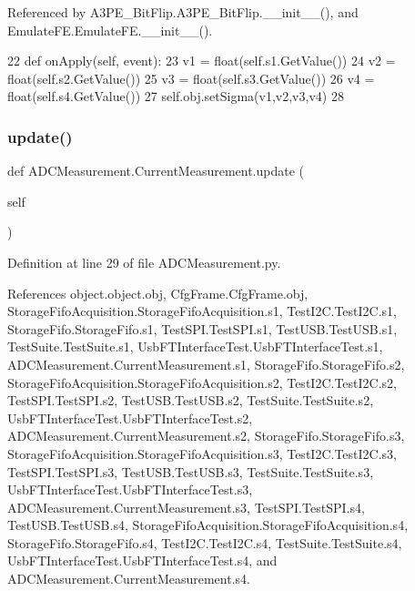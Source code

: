 Referenced by A3\+P\+E\+\_\+\+Bit\+Flip.\+A3\+P\+E\+\_\+\+Bit\+Flip.\+\_\+\+\_\+init\+\_\+\+\_\+(), and Emulate\+F\+E.\+Emulate\+F\+E.\+\_\+\+\_\+init\+\_\+\+\_\+().


\begin{DoxyCode}
22     \textcolor{keyword}{def }onApply(self, event):
23         v1 = float(self.s1.GetValue())
24         v2 = float(self.s2.GetValue())
25         v3 = float(self.s3.GetValue())
26         v4 = float(self.s4.GetValue())
27         self.obj.setSigma(v1,v2,v3,v4)
28 
\end{DoxyCode}
\mbox{\label{classADCMeasurement_1_1CurrentMeasurement_af3fb35c2334ccea6ac6274604bf09703}} 
\subsubsection{\texorpdfstring{update()}{update()}}
{\footnotesize\ttfamily def A\+D\+C\+Measurement.\+Current\+Measurement.\+update (\begin{DoxyParamCaption}\item[{}]{self }\end{DoxyParamCaption})}



Definition at line 29 of file A\+D\+C\+Measurement.\+py.



References object.\+object.\+obj, Cfg\+Frame.\+Cfg\+Frame.\+obj, Storage\+Fifo\+Acquisition.\+Storage\+Fifo\+Acquisition.\+s1, Test\+I2\+C.\+Test\+I2\+C.\+s1, Storage\+Fifo.\+Storage\+Fifo.\+s1, Test\+S\+P\+I.\+Test\+S\+P\+I.\+s1, Test\+U\+S\+B.\+Test\+U\+S\+B.\+s1, Test\+Suite.\+Test\+Suite.\+s1, Usb\+F\+T\+Interface\+Test.\+Usb\+F\+T\+Interface\+Test.\+s1, A\+D\+C\+Measurement.\+Current\+Measurement.\+s1, Storage\+Fifo.\+Storage\+Fifo.\+s2, Storage\+Fifo\+Acquisition.\+Storage\+Fifo\+Acquisition.\+s2, Test\+I2\+C.\+Test\+I2\+C.\+s2, Test\+S\+P\+I.\+Test\+S\+P\+I.\+s2, Test\+U\+S\+B.\+Test\+U\+S\+B.\+s2, Test\+Suite.\+Test\+Suite.\+s2, Usb\+F\+T\+Interface\+Test.\+Usb\+F\+T\+Interface\+Test.\+s2, A\+D\+C\+Measurement.\+Current\+Measurement.\+s2, Storage\+Fifo.\+Storage\+Fifo.\+s3, Storage\+Fifo\+Acquisition.\+Storage\+Fifo\+Acquisition.\+s3, Test\+I2\+C.\+Test\+I2\+C.\+s3, Test\+S\+P\+I.\+Test\+S\+P\+I.\+s3, Test\+U\+S\+B.\+Test\+U\+S\+B.\+s3, Test\+Suite.\+Test\+Suite.\+s3, Usb\+F\+T\+Interface\+Test.\+Usb\+F\+T\+Interface\+Test.\+s3, A\+D\+C\+Measurement.\+Current\+Measurement.\+s3, Test\+S\+P\+I.\+Test\+S\+P\+I.\+s4, Test\+U\+S\+B.\+Test\+U\+S\+B.\+s4, Storage\+Fifo\+Acquisition.\+Storage\+Fifo\+Acquisition.\+s4, Storage\+Fifo.\+Storage\+Fifo.\+s4, Test\+I2\+C.\+Test\+I2\+C.\+s4, Test\+Suite.\+Test\+Suite.\+s4, Usb\+F\+T\+Interface\+Test.\+Usb\+F\+T\+Interface\+Test.\+s4, and A\+D\+C\+Measurement.\+Current\+Measurement.\+s4.



